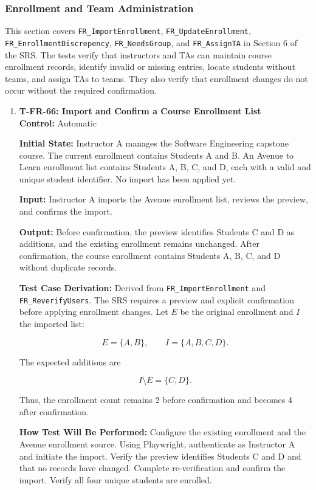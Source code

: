 \documentclass[12pt, titlepage]{article}
\begin{document}
\subsubsection{Enrollment and Team Administration}

This section covers \texttt{FR\_ImportEnrollment}, \texttt{FR\_UpdateEnrollment}, \texttt{FR\_EnrollmentDiscrepency}, \texttt{FR\_NeedsGroup}, and \texttt{FR\_AssignTA} in Section 6 of the SRS. The tests verify that instructors and TAs can maintain course enrollment records, identify invalid or missing entries, locate students without teams, and assign TAs to teams. They also verify that enrollment changes do not occur without the required confirmation.

\begin{enumerate}

\item \label{T-FR-66}\textbf{T-FR-66: Import and Confirm a Course Enrollment List}\\

\textbf{Control:} Automatic

\textbf{Initial State:} Instructor A manages the Software Engineering capstone course. The current enrollment contains Students A and B. An Avenue to Learn enrollment list contains Students A, B, C, and D, each with a valid and unique student identifier. No import has been applied yet.

\textbf{Input:} Instructor A imports the Avenue enrollment list, reviews the preview, and confirms the import.

\textbf{Output:} Before confirmation, the preview identifies Students C and D as additions, and the existing enrollment remains unchanged. After confirmation, the course enrollment contains Students A, B, C, and D without duplicate records.

\textbf{Test Case Derivation:} Derived from \texttt{FR\_ImportEnrollment} and \texttt{FR\_ReverifyUsers}. The SRS requires a preview and explicit confirmation before applying enrollment changes. Let $E$ be the original enrollment and $I$ the imported list:

\[
E=\{A,B\}, \qquad I=\{A,B,C,D\}.
\]

The expected additions are

\[
I\setminus E=\{C,D\}.
\]

Thus, the enrollment count remains 2 before confirmation and becomes 4 after confirmation.

\textbf{How Test Will Be Performed:} Configure the existing enrollment and the Avenue enrollment source. Using Playwright, authenticate as Instructor A and initiate the import. Verify the preview identifies Students C and D and that no records have changed. Complete re-verification and confirm the import. Verify all four unique students are enrolled.



\end{enumerate}
\end{document}
